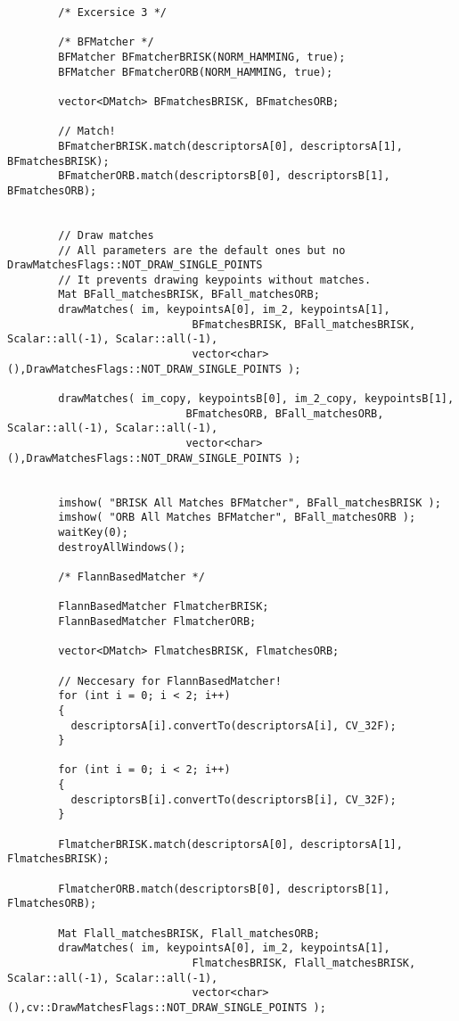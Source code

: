 \documentclass[a4paper, 11pt]{article}
\theoremstyle{definition}
\begin{document}
      \begin{lstlisting}
        /* Excersice 3 */

        /* BFMatcher */
        BFMatcher BFmatcherBRISK(NORM_HAMMING, true);
        BFMatcher BFmatcherORB(NORM_HAMMING, true);

        vector<DMatch> BFmatchesBRISK, BFmatchesORB;

        // Match!
        BFmatcherBRISK.match(descriptorsA[0], descriptorsA[1], BFmatchesBRISK);
        BFmatcherORB.match(descriptorsB[0], descriptorsB[1], BFmatchesORB);


        // Draw matches
        // All parameters are the default ones but no DrawMatchesFlags::NOT_DRAW_SINGLE_POINTS
        // It prevents drawing keypoints without matches.
        Mat BFall_matchesBRISK, BFall_matchesORB;
        drawMatches( im, keypointsA[0], im_2, keypointsA[1],
                             BFmatchesBRISK, BFall_matchesBRISK, Scalar::all(-1), Scalar::all(-1),
                             vector<char>(),DrawMatchesFlags::NOT_DRAW_SINGLE_POINTS );

        drawMatches( im_copy, keypointsB[0], im_2_copy, keypointsB[1],
                            BFmatchesORB, BFall_matchesORB, Scalar::all(-1), Scalar::all(-1),
                            vector<char>(),DrawMatchesFlags::NOT_DRAW_SINGLE_POINTS );


        imshow( "BRISK All Matches BFMatcher", BFall_matchesBRISK );
        imshow( "ORB All Matches BFMatcher", BFall_matchesORB );
        waitKey(0);
        destroyAllWindows();

        /* FlannBasedMatcher */

        FlannBasedMatcher FlmatcherBRISK;
        FlannBasedMatcher FlmatcherORB;

        vector<DMatch> FlmatchesBRISK, FlmatchesORB;

        // Neccesary for FlannBasedMatcher!
        for (int i = 0; i < 2; i++)
        {
          descriptorsA[i].convertTo(descriptorsA[i], CV_32F);
        }

        for (int i = 0; i < 2; i++)
        {
          descriptorsB[i].convertTo(descriptorsB[i], CV_32F);
        }

        FlmatcherBRISK.match(descriptorsA[0], descriptorsA[1], FlmatchesBRISK);

        FlmatcherORB.match(descriptorsB[0], descriptorsB[1], FlmatchesORB);

        Mat Flall_matchesBRISK, Flall_matchesORB;
        drawMatches( im, keypointsA[0], im_2, keypointsA[1],
                             FlmatchesBRISK, Flall_matchesBRISK, Scalar::all(-1), Scalar::all(-1),
                             vector<char>(),cv::DrawMatchesFlags::NOT_DRAW_SINGLE_POINTS );


\end{lstlisting}
\end{document}
